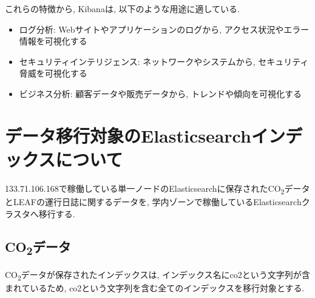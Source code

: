 これらの特徴から, Kibanaは, 以下のような用途に適している.

\begin{itemize}
  \item ログ分析: Webサイトやアプリケーションのログから, アクセス状況やエラー情報を可視化する
  \item セキュリティインテリジェンス: ネットワークやシステムから, セキュリティ脅威を可視化する
  \item ビジネス分析: 顧客データや販売データから, トレンドや傾向を可視化する
\end{itemize}




\section{データ移行対象のElasticsearchインデックスについて}

133.71.106.168で稼働している単一ノードのElasticsearchに保存されたCO\textsubscript{2}データとLEAFの運行日誌に関するデータを, 学内ゾーンで稼働しているElasticsearchクラスタへ移行する.

\subsection{CO\textsubscript{2}データ}

CO\textsubscript{2}データが保存されたインデックスは, インデックス名にco2という文字列が含まれているため, co2という文字列を含む全てのインデックスを移行対象とする.

